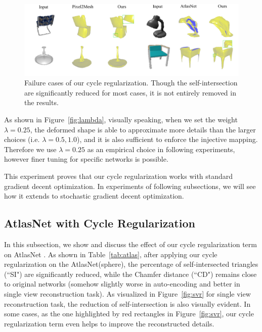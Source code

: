 \begin{figure}
	\centering
	\includegraphics[width=\textwidth]{img/limit/limit}
	\caption{Failure cases of our cycle regularization. Though the self-intersection are significantly reduced for most cases, it is not entirely removed in the results.}
	\label{fig:limit}
\end{figure}

As shown in Figure~\ref{fig:lambda}, visually speaking, when we set the weight $\lambda=0.25$, the deformed shape is able to approximate more details than the larger choices (i.e. $\lambda=0.5,1.0$), and it is also sufficient to enforce the injective mapping.  Therefore we use $\lambda=0.25$ as an empirical choice in following experiments, however finer tuning for specific networks is possible.

This experiment proves that our cycle regularization works with standard gradient decent optimization. In experiments of following subsections,  we will see how it extends to stochastic gradient decent optimization.

\subsection{AtlasNet with Cycle Regularization}
In this subsection, we show and discuss the effect of our cycle regularization term on AtlasNet \cite{atlasnet}. As shown in Table~\ref{tab:atlas}, after applying our cycle regularization on the AtlasNet(sphere), the percentage of self-intersected triangles (``SI") are significantly reduced, while the Chamfer distance (``CD") remains close to original networks (somehow slightly worse in auto-encoding and better in single view reconstruction task). As visualized in Figure~\ref{fig:svr} for single view reconstruction task, the reduction of self-intersection is also visually evident. In some cases, as the one highlighted by red rectangles in Figure~\ref{fig:svr}, our cycle regularization term even helps to improve the reconstructed details.

